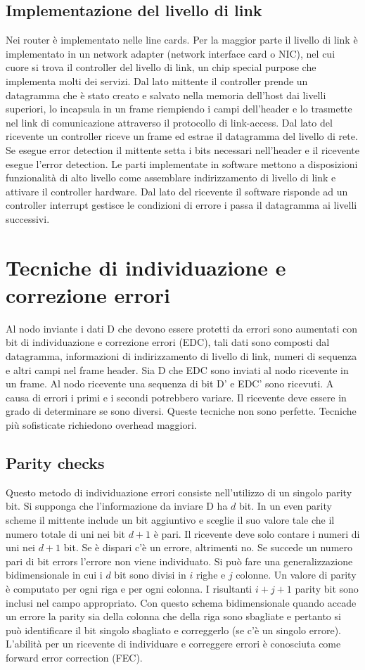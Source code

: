 \subsection{Implementazione del livello di link}
Nei router \`e implementato nelle line cards. Per la maggior parte il livello di link \`e implementato in un network adapter (network interface card o NIC), nel cui cuore si trova il controller del livello di link, un chip
special purpose che implementa molti dei servizi. Dal lato mittente il controller prende un datagramma che \`e stato creato e salvato nella memoria dell'host dai livelli superiori, lo incapsula in un frame 
riempiendo i campi dell'header e lo trasmette nel link di comunicazione attraverso il protocollo di link-access. Dal lato del ricevente un controller riceve un frame ed estrae il datagramma del livello di rete. Se 
esegue error detection il mittente setta i bits necessari nell'header e il ricevente esegue l'error detection. Le parti implementate in software mettono a disposizioni funzionalit\`a di alto livello come assemblare
indirizzamento di livello di link e attivare il controller hardware. Dal lato del ricevente il software risponde ad un controller interrupt gestisce le condizioni di errore i passa il datagramma ai livelli successivi. 
\section{Tecniche di individuazione e correzione errori}
Al nodo inviante i dati D che devono essere protetti da errori sono aumentati con bit di individuazione e correzione errori (EDC), tali dati sono composti dal datagramma, informazioni di indirizzamento di livello 
di link, numeri di sequenza e altri campi nel frame header. Sia D che EDC sono inviati al nodo ricevente in un frame. Al nodo ricevente una sequenza di bit D' e EDC' sono ricevuti. A causa di errori i primi e i 
secondi potrebbero variare. Il ricevente deve essere in grado di determinare se sono diversi. Queste tecniche non sono perfette. Tecniche pi\`u sofisticate richiedono overhead maggiori.
\subsection{Parity checks}
Questo metodo di individuazione errori consiste nell'utilizzo di un singolo parity bit. Si supponga che l'informazione da inviare D ha $d$ bit. In un even parity scheme il mittente include un bit aggiuntivo e 
sceglie il suo valore tale che il numero totale di uni nei bit $d+1$ \`e pari. Il ricevente deve solo contare i numeri di uni nei $d+1$ bit. Se \`e dispari c'\`e un errore, altrimenti no. Se succede un numero pari di bit 
errors l'errore non viene individuato. Si pu\`o fare una generalizzazione bidimensionale in cui i $d$ bit sono divisi in $i$ righe e $j$ colonne. Un valore di parity \`e computato per ogni riga e per ogni colonna. I 
risultanti $i+j+1$ parity bit sono inclusi nel campo appropriato. Con questo schema bidimensionale quando accade un errore la parity sia della colonna che della riga sono sbagliate e pertanto si pu\`o 
identificare il bit singolo sbagliato e correggerlo (se c'\`e un singolo errore). L'abilit\`a per un ricevente di individuare e correggere errori \`e conosciuta come forward error correction (FEC). 
